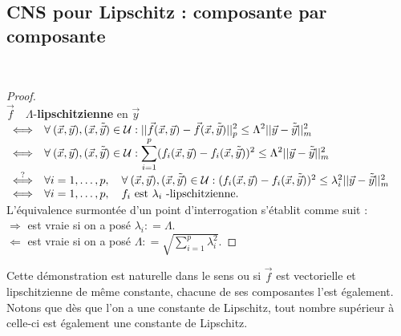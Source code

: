 	\subsection{CNS pour Lipschitz : composante par composante}
	\ 
\begin{proof}\ \\
$\vec f \quad \Lambda$-{\bf lipschitzienne}  en $\vec y$
\\
$
\begin{array}{ll}
\Longleftrightarrow & {\displaystyle \forall \: (\vec x , \vec y ) ,
 (\vec x, \tilde{\vec y} ) \in {\cal U} : || \vec f (\vec x, \vec y
 ) - \vec f ( \vec x , \tilde{\vec y} ) ||_p ^2 \leq \Lambda ^2 ||
 \vec y - \tilde{\vec y} ||^2 _m }\\
\Longleftrightarrow &{\displaystyle \forall \: (\vec x , \vec y )
, (\vec x, \tilde{\vec y} ) \in {\cal U} : \sum^p _{i=1} (  f_i
(\vec x, \vec y) -  f_i ( \vec x , \tilde{\vec y} ) )^2  \leq
\Lambda ^2 || \vec y - \tilde{\vec y} ||^2 _m } \\
\stackrel{?}{\Longleftrightarrow} &\forall i = 1 , \ldots , p,
\quad \forall \: (\vec x , \vec y ) , (\vec x, \tilde{\vec y} )
\in {\cal U} : (f_i (\vec x, \vec y) - f_i ( \vec x , \tilde{\vec
y} ) )^2  \leq \lambda ^2 _i || \vec y - \tilde{\vec y}
 ||^2 _m \\
\Longleftrightarrow  &\forall i = 1 , \ldots , p , \quad f_i
\mbox{ est } \lambda_i  \mbox{ -lipschitzienne.}

\end{array}
$ \\

L'équivalence surmontée d'un point d'interrogation
s'établit comme suit : \\

$\Longrightarrow$ est vraie si on a posé $\lambda_i : = \Lambda
$. \\

$ \Longleftarrow $ est vraie si on a posé ${\displaystyle
\Lambda : = \sqrt{\sum_{i=1}^{p} \lambda^2 _i}}$. 
\end{proof}
	Cette démonstration est naturelle dans le sens ou si $\vec{f}$ est vectorielle 
	et lipschitzienne de même constante, chacune de ses composantes l'est également. 
	Notons que dès que l'on a une constante de Lipschitz, tout nombre supérieur à 
	celle-ci est également une constante de Lipschitz.
	
	
